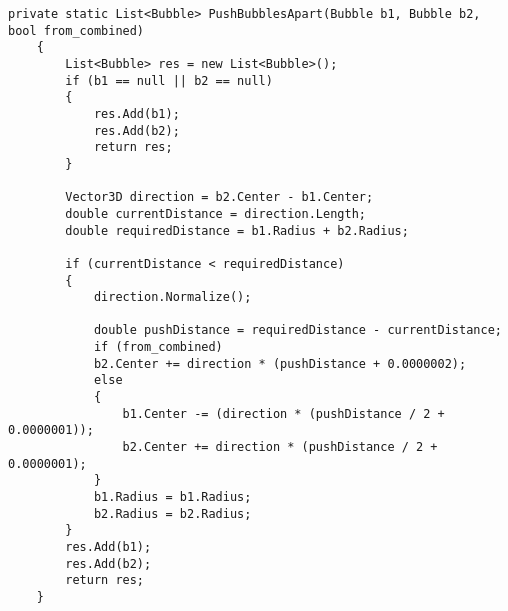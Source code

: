 \begin{lstlisting}[label=lst:push_bubbles_apart, caption=Реализация отталкивания пузырьков друг от друга]
	private static List<Bubble> PushBubblesApart(Bubble b1, Bubble b2, bool from_combined)
	{
		List<Bubble> res = new List<Bubble>();
		if (b1 == null || b2 == null)
		{
			res.Add(b1);
			res.Add(b2);
			return res;
		}
		
		Vector3D direction = b2.Center - b1.Center;
		double currentDistance = direction.Length;
		double requiredDistance = b1.Radius + b2.Radius;
		
		if (currentDistance < requiredDistance)
		{
			direction.Normalize();
			
			double pushDistance = requiredDistance - currentDistance;
			if (from_combined)
			b2.Center += direction * (pushDistance + 0.0000002);
			else
			{
				b1.Center -= (direction * (pushDistance / 2 + 0.0000001));
				b2.Center += direction * (pushDistance / 2 + 0.0000001); 
			}
			b1.Radius = b1.Radius;
			b2.Radius = b2.Radius;
		}
		res.Add(b1);
		res.Add(b2);
		return res;
	}
\end{lstlisting}

